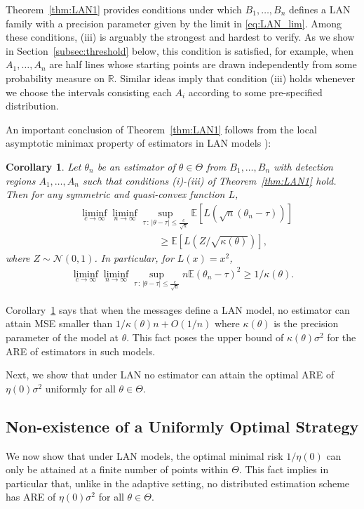 \documentclass[letterpaper, 11pt]{IEEEtran}      %
\newtheorem{cor}[thm]{\bf {Corollary}}
\newcommand{\Ncal}{\mathcal{N}}
\begin{document}
Theorem~\ref{thm:LAN1} provides conditions under which $B_1,\ldots,B_n$ defines a LAN family with a precision parameter given by the limit in \eqref{eq:LAN_lim}. 
%
Among these conditions, (iii) is arguably the strongest and hardest to verify. As we show in Section~\ref{subsec:threshold} below, this condition is satisfied, for example, when $A_1, \ldots,A_n$ are half lines whose starting points are drawn independently from some probability measure on $\mathbb R$. Similar ideas imply that condition (iii) holds whenever we choose the intervals consisting each $A_i$ according to some pre-specified distribution. \par
%
An important conclusion of  Theorem~\ref{thm:LAN1} follows from the local asymptotic minimax property of estimators in LAN models \cite{van2000asymptotic}):
\begin{cor} \label{cor:LA_minimax}
Let ${\theta}_n$ be an estimator of $\theta \in \Theta$ from $B_1,\ldots,B_n$ with detection regions $A_1,\ldots,A_n$ such that conditions (i)-(iii) of Theorem~\ref{thm:LAN1} hold. Then for any symmetric and quasi-convex function $L$, 
\begin{align*}
& \liminf_{c \to \infty} \liminf_{n \to \infty} \sup_{\tau\,:\,|\theta-\tau| \leq \frac{c}{\sqrt{n} }}  \mathbb E \left[ L\left( \sqrt{n}({\theta}_{n} - \tau) \right) \right]
\\
& \qquad \qquad \qquad \qquad \geq \mathbb E \left[ L (Z/\sqrt{\kappa(\theta)}) \right],
\end{align*}
where $Z \sim \Ncal(0,1)$. In particular, for $L(x) = x^2$,
\begin{align*}
\liminf_{c \to \infty} \liminf_{n \to \infty} \sup_{\tau\,:\,|\theta-\tau| \leq \frac{c}{\sqrt{n} }}  n \mathbb E  \left( {\theta}_{n} - \tau \right)^2 \geq 1/\kappa(\theta).
\end{align*}
\end{cor}
%
Corollary~\ref{cor:LA_minimax} says that when the messages define a LAN model, no estimator can attain MSE smaller than $1/\kappa(\theta)n + O(1/n)$ where $\kappa(\theta)$ is the precision parameter of the model at $\theta$. This fact poses the upper bound of $\kappa(\theta)\sigma^2$ for the ARE of estimators in such models. \par

Next, we show that under LAN no estimator can attain the optimal ARE of $\eta(0)\sigma^2$ uniformly for all $\theta \in \Theta$.

\subsection{Non-existence of a Uniformly Optimal Strategy}
We now show that under LAN models, the optimal minimal risk $1/\eta(0)$ can only be attained at a finite number of points within $\Theta$. This fact implies in particular that, unlike in the adaptive setting, no distributed estimation scheme has ARE of $\eta(0)\sigma^2$ for all $\theta \in \Theta$. 
\end{document}

